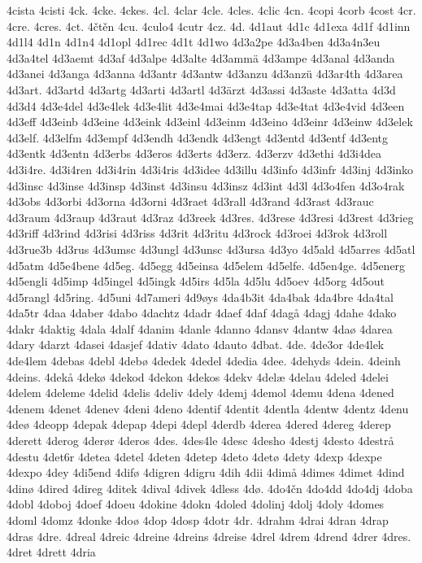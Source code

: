 4cista
4cisti
4ck.
4cke.
4ckes.
4cl.
4clar
4cle.
4cles.
4clic
4cn.
4copi
4corb
4cost
4cr.
4cre.
4cres.
4ct.
4čtěn
4cu.
4culo4
4cutr
4cz.
4d.
4d1aut
4d1c
4d1exa
4d1f
4d1inn
4d1l4
4d1n
4d1n4
4d1opl
4d1rec
4d1t
4d1wo
4d3a2pe
4d3a4ben
4d3a4n3eu
4d3a4tel
4d3aemt
4d3af
4d3alpe
4d3alte
4d3ammä
4d3ampe
4d3anal
4d3anda
4d3anei
4d3anga
4d3anna
4d3antr
4d3antw
4d3anzu
4d3anzü
4d3ar4th
4d3area
4d3art.
4d3artd
4d3artg
4d3arti
4d3artl
4d3ärzt
4d3assi
4d3aste
4d3atta
4d3d
4d3d4
4d3e4del
4d3e4lek
4d3e4lit
4d3e4mai
4d3e4tap
4d3e4tat
4d3e4vid
4d3een
4d3eff
4d3einb
4d3eine
4d3eink
4d3einl
4d3einm
4d3eino
4d3einr
4d3einw
4d3elek
4d3elf.
4d3elfm
4d3empf
4d3endh
4d3endk
4d3engt
4d3entd
4d3entf
4d3entg
4d3entk
4d3entn
4d3erbs
4d3eros
4d3erts
4d3erz.
4d3erzv
4d3ethi
4d3i4dea
4d3i4re.
4d3i4ren
4d3i4rin
4d3i4ris
4d3idee
4d3illu
4d3info
4d3infr
4d3inj
4d3inko
4d3insc
4d3inse
4d3insp
4d3inst
4d3insu
4d3insz
4d3int
4d3l
4d3o4fen
4d3o4rak
4d3obs
4d3orbi
4d3orna
4d3orni
4d3raet
4d3rall
4d3rand
4d3rast
4d3rauc
4d3raum
4d3raup
4d3raut
4d3raz
4d3reek
4d3res.
4d3rese
4d3resi
4d3rest
4d3rieg
4d3riff
4d3rind
4d3risi
4d3riss
4d3rit
4d3ritu
4d3rock
4d3roei
4d3rok
4d3roll
4d3rue3b
4d3rus
4d3umsc
4d3ungl
4d3unsc
4d3ursa
4d3yo
4d5ald
4d5arres
4d5atl
4d5atm
4d5e4bene
4d5eg.
4d5egg
4d5einsa
4d5elem
4d5elfe.
4d5en4ge.
4d5energ
4d5engli
4d5imp
4d5ingel
4d5ingk
4d5irs
4d5la
4d5lu
4d5oev
4d5org
4d5out
4d5rangl
4d5ring.
4d5uni
4d7ameri
4d9øys
4da4b3it
4da4bak
4da4bre
4da4tal
4da5tr
4daa
4daber
4dabo
4dachtz
4dadr
4daef
4daf
4dagå
4dagj
4dahe
4dako
4dakr
4daktig
4dala
4dalf
4danim
4danle
4danno
4dansv
4dantw
4daø
4darea
4dary
4darzt
4dasei
4dasjef
4dativ
4dato
4dauto
4dbat.
4de.
4de3or
4de4lek
4de4lem
4debas
4debl
4debø
4dedek
4dedel
4dedia
4dee.
4dehyds
4dein.
4deinh
4deins.
4dekå
4dekø
4dekod
4dekon
4dekos
4dekv
4delæ
4delau
4deled
4delei
4delem
4deleme
4delid
4delis
4deliv
4dely
4demj
4demol
4demu
4dena
4dened
4denem
4denet
4denev
4deni
4deno
4dentif
4dentit
4dentla
4dentw
4dentz
4denu
4deø
4deopp
4depak
4depap
4depi
4depl
4derdb
4derea
4dered
4dereg
4derep
4derett
4derog
4derør
4deros
4des.
4des4le
4desc
4desho
4destj
4desto
4destrå
4destu
4det6r
4detea
4detel
4deten
4detep
4deto
4detø
4dety
4dexp
4dexpe
4dexpo
4dey
4di5end
4difø
4digren
4digru
4dih
4dii
4dimå
4dimes
4dimet
4dind
4dinø
4dired
4direg
4ditek
4dival
4divek
4dless
4dø.
4do4čn
4do4dd
4do4dj
4doba
4dobl
4doboj
4doef
4doeu
4dokine
4dokn
4doled
4dolinj
4dolj
4doly
4domes
4doml
4domz
4donke
4doø
4dop
4dosp
4dotr
4dr.
4drahm
4drai
4dran
4drap
4dras
4dre.
4dreal
4dreic
4dreine
4dreins
4dreise
4drel
4drem
4drend
4drer
4dres.
4dret
4drett
4dria
